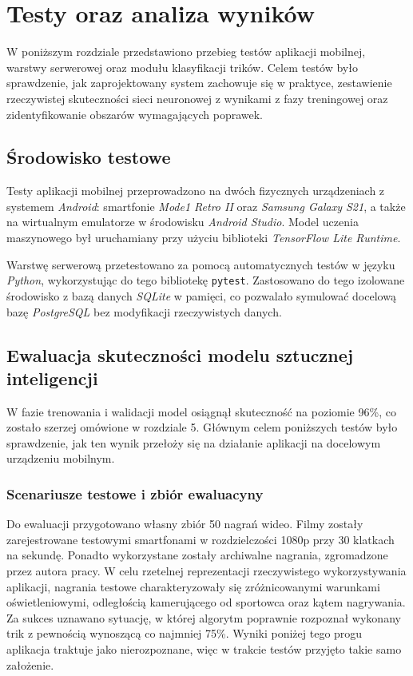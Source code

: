 \newpage
\section{Testy oraz analiza wyników}
    W poniższym rozdziale przedstawiono przebieg testów aplikacji mobilnej, warstwy serwerowej oraz modułu klasyfikacji trików. Celem testów było sprawdzenie, jak zaprojektowany system zachowuje się w praktyce, zestawienie rzeczywistej skuteczności sieci neuronowej z wynikami z fazy treningowej oraz zidentyfikowanie obszarów wymagających poprawek.

    \subsection{Środowisko testowe}

        Testy aplikacji mobilnej przeprowadzono na dwóch fizycznych urządzeniach z systemem \textit{Android}: smartfonie \textit{Mode1 Retro II} oraz \textit{Samsung Galaxy S21}, a także na wirtualnym emulatorze w środowisku \textit{Android Studio}. Model uczenia maszynowego był uruchamiany przy użyciu biblioteki \textit{TensorFlow Lite Runtime}.

        Warstwę serwerową przetestowano za pomocą automatycznych testów w języku \textit{Python}, wykorzystując do tego bibliotekę \texttt{pytest}. Zastosowano do tego izolowane środowisko z bazą danych \textit{SQLite} w pamięci, co pozwalało symulować docelową bazę \textit{PostgreSQL} bez modyfikacji rzeczywistych danych.

    \subsection{Ewaluacja skuteczności modelu sztucznej inteligencji}

        W fazie trenowania i walidacji model osiągnął skuteczność na poziomie 96\%, co zostało szerzej omówione w rozdziale 5. Głównym celem poniższych testów było sprawdzenie, jak ten wynik przełoży się na działanie aplikacji na docelowym urządzeniu mobilnym.

        \subsubsection{Scenariusze testowe i zbiór ewaluacyny}

            Do ewaluacji przygotowano własny zbiór 50 nagrań wideo. Filmy zostały zarejestrowane testowymi smartfonami w rozdzielczości 1080p przy 30 klatkach na sekundę. Ponadto wykorzystane zostały archiwalne nagrania, zgromadzone przez autora pracy. W celu rzetelnej reprezentacji rzeczywistego wykorzystywania aplikacji, nagrania testowe charakteryzowały się zróżnicowanymi warunkami oświetleniowymi, odległością kamerującego od sportowca oraz kątem nagrywania. Za sukces uznawano sytuację, w której algorytm poprawnie rozpoznał wykonany trik z pewnością wynoszącą co najmniej 75\%. Wyniki poniżej tego progu aplikacja traktuje jako nierozpoznane, więc w trakcie testów przyjęto takie samo założenie.

